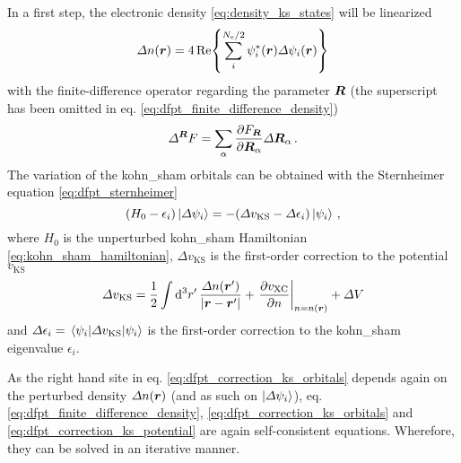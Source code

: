 \documentclass[main.tex]{subfiles}
\begin{document}
In a first step, the electronic density \ref{eq:density_ks_states} will be linearized
\begin{equation}\label{eq:dfpt_finite_difference_density}
    \Delta n(\vb*{r}) = 4 \Re{\sum_i^{N_{\mathrm{e}} / 2} \psi_i^* (\vb*{r}) \Delta \psi_i (\vb*{r})}
\end{equation}
with the finite-difference operator regarding the parameter \(\vb*{R}\) (the superscript has been omitted in eq. \ref{eq:dfpt_finite_difference_density})
\begin{equation}
    \Delta^{\vb*{R}} F = \sum_{\alpha} \pdv{F_{\vb*{R}}}{\vb*{R}_{\alpha}} \Delta \vb*{R}_{\alpha}\,.
\end{equation}
The variation of the \acrshort{kohn_sham} orbitals can be obtained with the Sternheimer equation \ref{eq:dfpt_sternheimer}
\begin{equation}\label{eq:dfpt_correction_ks_orbitals}
    (H_0 - \epsilon_i) \ket{\Delta \psi_i} = - (\Delta v_{\mathrm{KS}} - \Delta \epsilon_i) \ket{\psi_i}\,,
\end{equation}
where \(H_0\) is the unperturbed \acrshort{kohn_sham} Hamiltonian \ref{eq:kohn_sham_hamiltonian}, \(\Delta v_{\mathrm{KS}}\) is the first-order correction to the potential \(v_{\mathrm{KS}}\)
\begin{equation}\label{eq:dfpt_correction_ks_potential}
    \Delta v_{\mathrm{KS}} = \frac{1}{2} \int \dd[3]{r^{\prime}} \frac{\Delta n(\vb*{r}^{\prime})}{\vert \vb*{r} - \vb*{r}^{\prime} \vert} + \left. \pdv{v_{\mathrm{XC}}}{n} \right\vert_{n = n(\vb*{r})} + \Delta V
\end{equation}
and \(\Delta \epsilon_i = \expval{\Delta v_{\mathrm{KS}}}{\psi_i}\) is the first-order correction to the \acrshort{kohn_sham} eigenvalue \(\epsilon_i\).

As the right hand site in eq. \ref{eq:dfpt_correction_ks_orbitals} depends again on the perturbed density \(\Delta n(\vb*{r})\) (and as such on \(\ket{\Delta \psi_i}\)), eq. \ref{eq:dfpt_finite_difference_density}, \ref{eq:dfpt_correction_ks_orbitals} and \ref{eq:dfpt_correction_ks_potential} are again self-consistent equations. Wherefore, they can be solved in an iterative manner.
\end{document}
